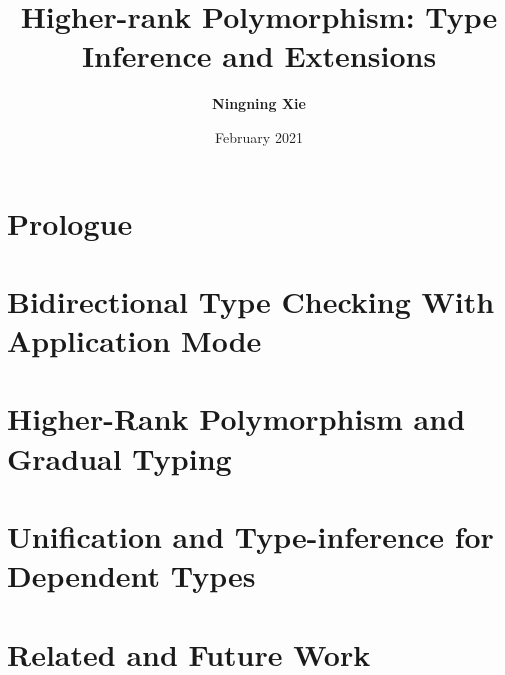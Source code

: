 

\title{Higher-rank Polymorphism: Type Inference and Extensions}
\author{\textbf{Ningning Xie}}
\date{February 2021}




\maketitle

\begin{abstract}
 
\end{abstract}


\frontmatter
\makedeclaration
\makeAck
\tableofcontents
\listoffigures
\listoftables

\mainmatter

\part{Prologue}





\part{Bidirectional Type Checking With Application Mode} \label{part:typeinference}



\part{Higher-Rank Polymorphism and Gradual Typing}
\label{part:gradual}



\part{Unification and Type-inference for Dependent Types} \label{part:dependentTypes}






\part{Related and Future Work}

